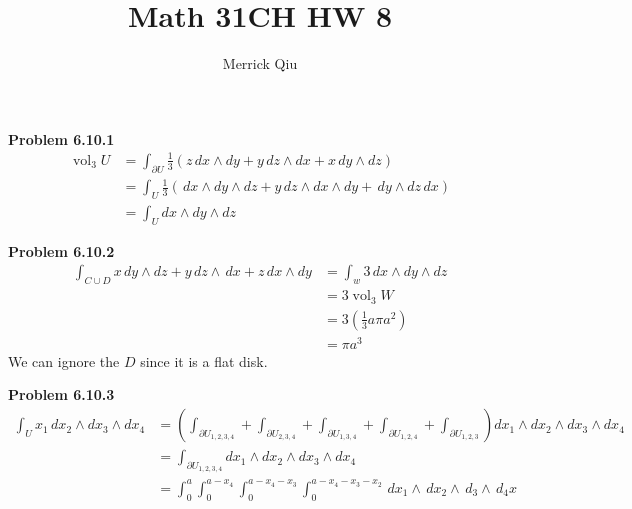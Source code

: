 \documentclass[12pt]{article}
\title{Math 31CH HW 8\\}
\author{Merrick Qiu}
\date{}
\newcommand{\vol}{\operatorname{vol}}
\begin{document}
\textbf{Problem 6.10.1}
\begin{align*}
    \vol_3 U
    &= \int_{\partial U} \frac{1}{3} 
        (z\,dx \wedge dy + y \,dz \wedge dx + x \,dy \wedge dz) \\
    &= \int_{U} \frac{1}{3} 
        (\,dx \wedge dy \wedge dz + y \,dz \wedge dx \wedge dy + \,dy \wedge dz \, dx) \\
    &= \int_{U} dx \wedge dy \wedge dz
\end{align*}

\textbf{Problem 6.10.2}
\begin{align*}
    \int_{C\cup D} x \,dy \wedge dz + y \,dz \wedge \,dx + z\,dx \wedge dy
    &= \int_w 3 \,dx \wedge dy \wedge dz \\
    &= 3 \vol_3 W \\
    &= 3(\frac{1}{3}a\pi a^2) \\
    &= \pi a^3
\end{align*}
We can ignore the $D$ since it is a flat disk.

\textbf{Problem 6.10.3}
\begin{align*}
    \int_{U} x_1 \, dx_2 \wedge dx_3 \wedge dx_4
    &= \left( \int_{\partial U_{1,2,3,4}} + \int_{\partial U_{2,3,4}} + \int_{\partial U_{1,3,4}} + \int_{\partial U_{1,2,4}} + \int_{\partial U_{1,2,3}} \right)
        dx_1 \wedge dx_2 \wedge dx_3 \wedge dx_4 \\
    &= \int_{\partial U_{1,2,3,4}} dx_1 \wedge dx_2 \wedge dx_3 \wedge dx_4 \\
    &= \int_0^a \int_0^{a-x_4} \int_0^{a-x_4-x_3} \int_0^{a-x_4-x_3-x_2}\,dx_1 \wedge \,dx_2 \wedge \,d_3 \wedge \,d_4x
\end{align*}
\end{document}
